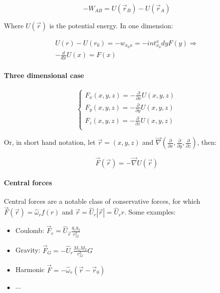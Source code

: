     $$-W_{AB} = U(\vec{r}_B) - U(\vec{r}_A)$$

    Where $U(\vec{r})$ is the potential energy.
    In one dimension:

    \begin{align*}
      U(r) -U(r_0) = -w_{x_0x} = -int_{x_0}^xdyF(y) \Rightarrow\\
      -\frac{d{}}{d{x}}U(x) = F(x)
    \end{align*}

      \paragraph{Three dimensional case}
  
      $$\begin{cases}
        F_x(x,y,z) = - \frac{\partial {}}{\partial {x}}U(x,y,z)\\
        F_y(x,y,z) = - \frac{\partial {}}{\partial {y}}U(x,y,z)\\
        F_z(x,y,z) = - \frac{\partial {}}{\partial {z}}U(x,y,z)\\
      \end{cases}$$
  
      Or, in short hand notation, let $\vec{r}=(x,y,z)$ and $\vec{\nabla}(\frac{\partial {}}{\partial {x}},\frac{\partial {}}{\partial {y}},\frac{\partial {}}{\partial {z}})$, then:
  
      $$\vec{F}(\vec{r}) = -\vec{\nabla}U(\vec{r})$$
  
      \paragraph{Central forces}
      Central forces are a notable class of conservative forces, for which $\vec{F}(\vec{r}) = \hat{\omega}_{r}f(r)$ and $\vec{r} = \hat{U}_{r}|\vec{r}| = \hat{U}_{r}r$.
      Some examples:

      \begin{multicols}{2}
        \begin{itemize}
          \item Coulomb: $\vec{F}_e = \hat{U}_{\vec{r}}\frac{q_1q_2}{r_{12}^2}$
          \item Gravity: $\vec{F}_G = -\hat{U}_r\frac{M_1M_2}{r_{12}^2}G$
          \item Harmonic $\vec{F} = -\hat{\omega}_r(\vec{r}-\vec{r}_0)$
          \item $\cdots$
        \end{itemize}
      \end{multicols}

